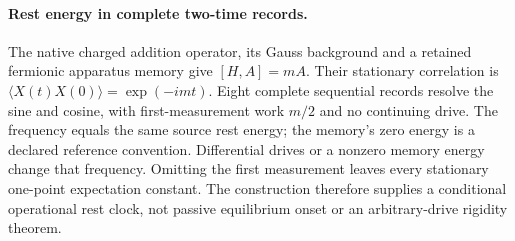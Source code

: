 \paragraph{Rest energy in complete two-time records.}
The native charged addition operator, its Gauss background and a retained
fermionic apparatus memory give $[H,A]=mA$. Their stationary correlation is
$\langle X(t)X(0)\rangle=\exp(-imt)$. Eight complete sequential records resolve
the sine and cosine, with first-measurement work $m/2$ and no continuing drive.
The frequency equals the same source rest energy; the memory's zero energy
is a declared reference convention. Differential drives or a nonzero memory
energy change that frequency. Omitting the first measurement leaves every
stationary one-point expectation constant. The construction therefore
supplies a conditional operational rest clock, not passive equilibrium
onset or an arbitrary-drive rigidity theorem.
